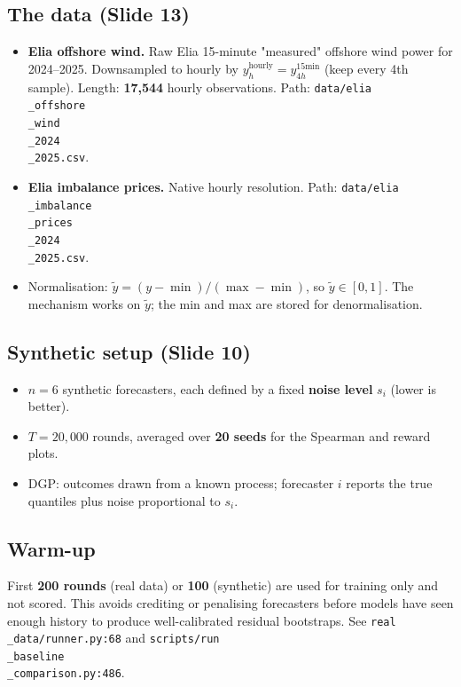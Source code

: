 \documentclass[11pt]{article}
\begin{document}
\subsection{The data (Slide 13)}


\begin{itemize}
\item \textbf{Elia offshore wind.} Raw Elia 15-minute "measured" offshore wind power for 2024--2025. Downsampled to hourly by $y^{\text{hourly}}_h = y^{\text{15min}}_{4h}$ (keep every 4th sample). Length: \textbf{17,544} hourly observations. Path: \texttt{data/elia\\_offshore\\_wind\\_2024\\_2025.csv}.
\item \textbf{Elia imbalance prices.} Native hourly resolution. Path: \texttt{data/elia\\_imbalance\\_prices\\_2024\\_2025.csv}.
\item Normalisation: $\tilde y = (y - \min)/(\max - \min)$, so $\tilde y \in [0,1]$. The mechanism works on $\tilde y$; the min and max are stored for denormalisation.
\end{itemize}

\subsection{Synthetic setup (Slide 10)}


\begin{itemize}
\item $n = 6$ synthetic forecasters, each defined by a fixed \textbf{noise level} $s_i$ (lower is better).
\item $T = 20{,}000$ rounds, averaged over \textbf{20 seeds} for the Spearman and reward plots.
\item DGP: outcomes drawn from a known process; forecaster $i$ reports the true quantiles plus noise proportional to $s_i$.
\end{itemize}

\subsection{Warm-up}


First \textbf{200 rounds} (real data) or \textbf{100} (synthetic) are used for training only and not scored. This avoids crediting or penalising forecasters before models have seen enough history to produce well-calibrated residual bootstraps. See \texttt{real\\_data/runner.py:68} and \texttt{scripts/run\\_baseline\\_comparison.py:486}.
\end{document}
